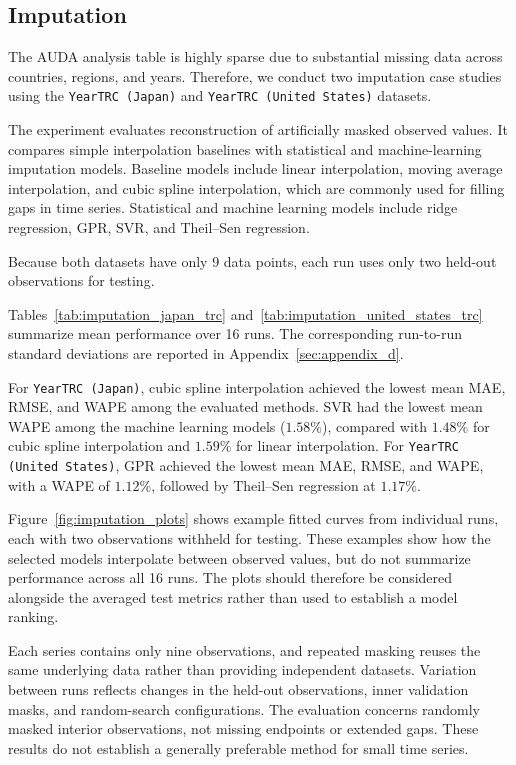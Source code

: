 \subsection{Imputation}

The AUDA analysis table is highly sparse due to substantial missing data across countries, regions, and years.
Therefore, we conduct two imputation case studies using the \texttt{YearTRC (Japan)} and \texttt{YearTRC (United States)} datasets.

The experiment evaluates reconstruction of artificially masked observed values.
It compares simple interpolation baselines with statistical and machine-learning imputation models.
Baseline models include linear interpolation, moving average interpolation, and cubic spline interpolation, which are commonly used for filling gaps in time series. Statistical and machine learning models include ridge regression, GPR, SVR, and Theil--Sen regression.

Because both datasets have only 9 data points, each run uses only two held-out observations for testing.

Tables~\ref{tab:imputation_japan_trc} and~\ref{tab:imputation_united_states_trc} summarize mean performance over 16 runs.
The corresponding run-to-run standard deviations are reported in Appendix~\ref{sec:appendix_d}.




For \texttt{YearTRC (Japan)}, cubic spline interpolation achieved the lowest mean MAE, RMSE, and WAPE among the evaluated methods.
SVR had the lowest mean WAPE among the machine learning models (\(1.58\%\)), compared with \(1.48\%\) for cubic spline interpolation and \(1.59\%\) for linear interpolation.
For \texttt{YearTRC (United States)}, GPR achieved the lowest mean MAE, RMSE, and WAPE, with a WAPE of \(1.12\%\), followed by Theil--Sen regression at \(1.17\%\).

Figure~\ref{fig:imputation_plots} shows example fitted curves from individual runs, each with two observations withheld for testing.
These examples show how the selected models interpolate between observed values, but do not summarize performance across all 16 runs.
The plots should therefore be considered alongside the averaged test metrics rather than used to establish a model ranking.



Each series contains only nine observations, and repeated masking reuses the same underlying data rather than providing independent datasets.
Variation between runs reflects changes in the held-out observations, inner validation masks, and random-search configurations.
The evaluation concerns randomly masked interior observations, not missing endpoints or extended gaps.
These results do not establish a generally preferable method for small time series.

